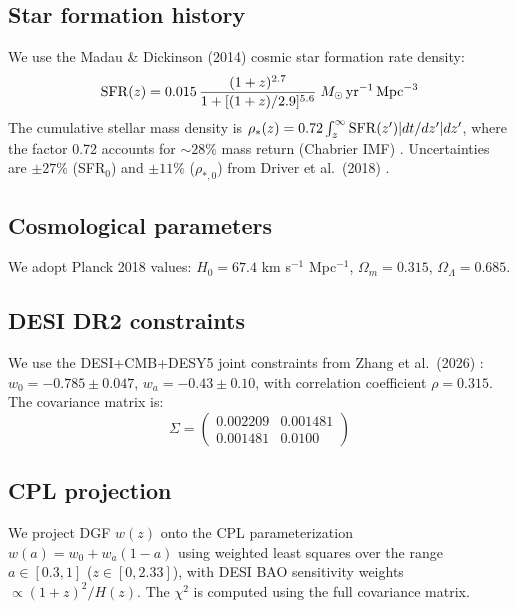 \documentclass[12pt,a4paper]{article}
\begin{document}
\subsection{Star formation history}

We use the Madau \& Dickinson (2014) \cite{madau2014} cosmic star formation rate density:
\begin{equation}
{\rm SFR}(z)=0.015\,\frac{(1+z)^{2.7}}{1+[(1+z)/2.9]^{5.6}}\;M_\odot\,{\rm yr}^{-1}\,{\rm Mpc}^{-3}
\end{equation}
The cumulative stellar mass density is $\rho_*(z)=0.72\int_z^\infty{\rm SFR}(z')|dt/dz'|dz'$, where the factor 0.72 accounts for $\sim28\%$ mass return (Chabrier IMF) \cite{madau2014}. Uncertainties are $\pm27\%$ (SFR$_0$) and $\pm11\%$ ($\rho_{*,0}$) from Driver et al.\ (2018) \cite{driver2018}.

\subsection{Cosmological parameters}

We adopt Planck 2018 \cite{planck2018} values: $H_0=67.4$ km s$^{-1}$ Mpc$^{-1}$, $\Omega_m=0.315$, $\Omega_\Lambda=0.685$.

\subsection{DESI DR2 constraints}

We use the DESI+CMB+DESY5 joint constraints from Zhang et al.\ (2026) \cite{zhang2026}: $w_0=-0.785\pm0.047$, $w_a=-0.43\pm0.10$, with correlation coefficient $\rho=0.315$. The covariance matrix is:
\begin{equation}
\Sigma = \begin{pmatrix} 0.002209 & 0.001481 \\ 0.001481 & 0.0100 \end{pmatrix}
\end{equation}

\subsection{CPL projection}

We project DGF $w(z)$ onto the CPL parameterization $w(a)=w_0+w_a(1-a)$ using weighted least squares over the range $a\in[0.3,1]$ ($z\in[0,2.33]$), with DESI BAO sensitivity weights $\propto(1+z)^2/H(z)$. The $\chi^2$ is computed using the full covariance matrix.
\end{document}

